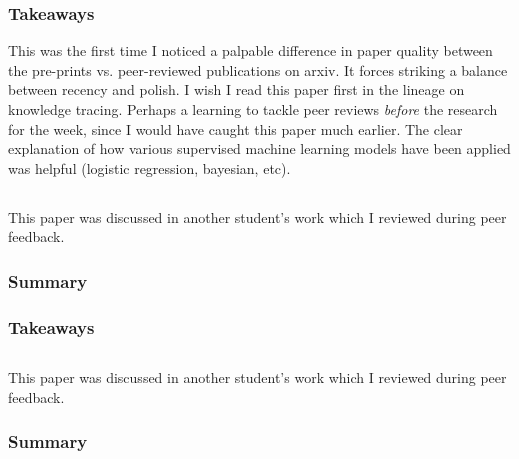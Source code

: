 \documentclass[
	letterpaper, %
]{jdf}
\begin{document}
\subsubsection{Takeaways}
This was the first time I noticed a palpable difference in paper quality between the pre-prints vs. peer-reviewed publications on arxiv. It forces striking a balance between recency and polish. I wish I read this paper first in the lineage on knowledge tracing. Perhaps a learning to tackle peer reviews \textit{before} the research for the week, since I would have caught this paper much earlier. The clear explanation of how various supervised machine learning models have been applied was helpful (logistic regression, bayesian, etc).

\subsection{}
This paper was discussed in another student's work which I reviewed during peer feedback.

\subsubsection{Summary}


\subsubsection{Takeaways}

\subsection{}
This paper was discussed in another student's work which I reviewed during peer feedback.

\subsubsection{Summary}
\end{document}
